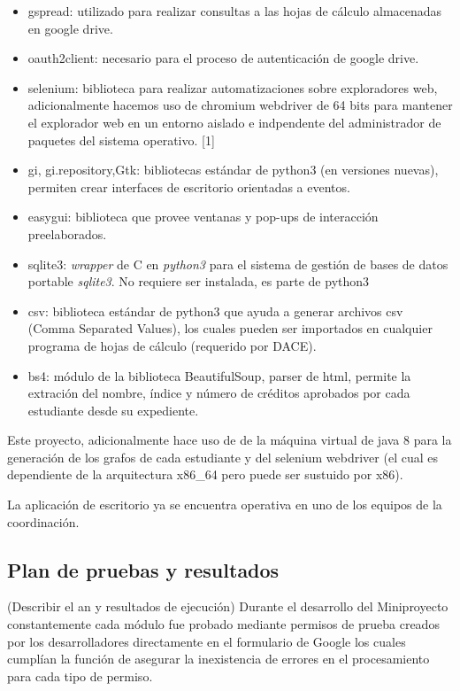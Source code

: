 \documentclass[]{article}
\begin{document}
\begin{itemize}
\itemsep1pt\parskip0pt
\item
  gspread: utilizado para realizar consultas a las hojas de cálculo
  almacenadas en google drive.
\item
  oauth2client: necesario para el proceso de autenticación de google
  drive.
\item
  selenium: biblioteca para realizar automatizaciones sobre exploradores
  web, adicionalmente hacemos uso de chromium webdriver de 64 bits para
  mantener el explorador web en un entorno aislado e indpendente del
  administrador de paquetes del sistema operativo. {[}1{]}
\item
  gi, gi.repository,Gtk: bibliotecas estándar de python3 (en versiones
  nuevas), permiten crear interfaces de escritorio orientadas a eventos.
\item
  easygui: biblioteca que provee ventanas y pop-ups de interacción
  preelaborados.
\item
  sqlite3: \emph{wrapper} de C en \emph{python3} para el sistema de
  gestión de bases de datos portable \emph{sqlite3}. No requiere ser
  instalada, es parte de python3
\item
  csv: biblioteca estándar de python3 que ayuda a generar archivos csv
  (Comma Separated Values), los cuales pueden ser importados en
  cualquier programa de hojas de cálculo (requerido por DACE).
\item
  bs4: módulo de la biblioteca BeautifulSoup, parser de html, permite la
  extración del nombre, índice y número de créditos aprobados por cada
  estudiante desde su expediente.
\end{itemize}

Este proyecto, adicionalmente hace uso de de la máquina virtual de java
8 para la generación de los grafos de cada estudiante y del selenium
webdriver (el cual es dependiente de la arquitectura x86\_64 pero puede
ser sustuido por x86).

La aplicación de escritorio ya se encuentra operativa en uno de los
equipos de la coordinación.

\subsection{Plan de pruebas y
resultados}\label{plan-de-pruebas-y-resultados}

(Describir el an y resultados de ejecución) Durante el desarrollo del
Miniproyecto constantemente cada módulo fue probado mediante permisos de
prueba creados por los desarrolladores directamente en el formulario de
Google los cuales cumplían la función de asegurar la inexistencia de
errores en el procesamiento para cada tipo de permiso.
\end{document}

